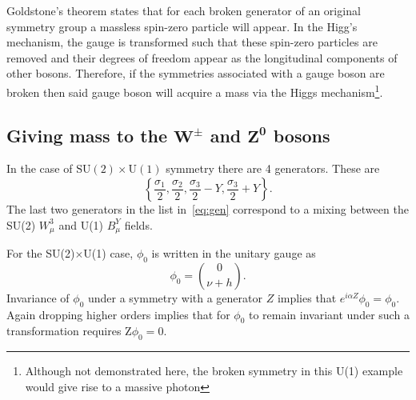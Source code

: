 
Goldstone's theorem states that for each broken generator of an original symmetry group a massless spin-zero particle will appear. In the Higg's mechanism, the gauge is transformed such that these spin-zero particles are removed and their degrees of freedom appear as the longitudinal components of other bosons. Therefore, if the symmetries associated with a gauge boson are broken then said gauge boson will acquire a mass via the Higgs mechanism\footnote{Although not demonstrated here, the broken symmetry in this U(1) example would give rise to a massive photon}. 
\subsection[Giving mass to the $W^{\pm}$ and $Z^{0}$ bosons]{Giving mass to the $\mathbold{W^{\pm}}$ and $\mathbold{Z^{0}}$ bosons}
In the case of $\mathrm{SU(2)\times U(1)}$ symmetry  there are 4 generators. These are
\begin{equation}
  \left\{\frac{\sigma_{1}}{2},\frac{\sigma_{2}}{2}, \frac{\sigma_{3}}{2} - Y, \frac{\sigma_{3}}{2} +Y\right\}.
  \label{eq:gen}
\end{equation}
  The last two generators in the list in~\autoref{eq:gen} correspond to a mixing between the SU(2) $W^{3}_{\mu}$ and U(1) $B^{Y}_{\mu}$ fields. %

  For the SU(2)$\times$U(1) case, $\phi_{0}$ is written in the unitary gauge as
\begin{equation}
\phi_{0} = \binom{0}{\nu +h}.
  \end{equation}
Invariance of $\phi_{0}$  under a symmetry with a generator $Z$ implies that $e^{i\alpha Z}\phi_{0} = \phi_{0}$.  Again dropping higher orders implies that for $\phi_{0}$ to remain invariant under such a transformation requires Z$\phi_{0} = 0$.

